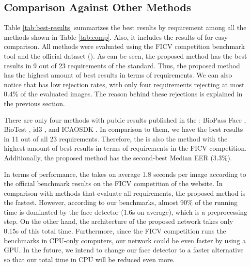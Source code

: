 
\subsection{Comparison Against Other Methods}

Table \ref{tab:best-results} summarizes the best results by requirement among all the methods shown in Table \ref{tab:comp}. Also, it includes the results of \methodname for easy comparison. All methods were evaluated using the FICV competition benchmark tool and the official dataset (\ficvofficial). As can be seen, the proposed method has the best results in 9 out of 23 requirements of the \icao standard. Thus, the proposed method has the highest amount of best results in terms of requirements. We can also notice that \methodname has low rejection rates, with only four requirements rejecting at most 0.4\% of the evaluated images. The reason behind these rejections is explained in the previous section. 



There are only four methods with public results published in the \fvcongoing: BioPass Face \citep{fvcVsoft}, BioTest \citep{fvcBioTest}, id3 \citep{fvcICAOCompliance}, and ICAOSDK \citep{fvcSeamfix}. In comparison to them, we have the best results in 11 out of all 23 requirements. Therefore, the \methodname is also the method with the highest amount of best results in terms of requirements in the FICV competition. Additionally, the proposed method has the second-best Median EER (3.3\%).

In terms of performance, the \methodname takes on average 1.8 seconds per image according to the official benchmark results on the FICV competition of the \fvcongoing website. In comparison with methods that evaluate all requirements, the proposed method is the fastest. However, according to our benchmarks, almost 90\% of the \methodname running time is dominated by the face detector (1.6s on average), which is a preprocessing step. On the other hand, the architecture of the proposed network takes only 0.15s of this total time. Furthermore, since the FICV competition runs the benchmarks in CPU-only computers, our network could be even faster by using a GPU. In the future, we intend to change our face detector to a faster alternative so that our total time in CPU will be reduced even more.

